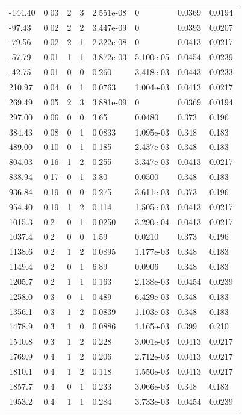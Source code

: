 \documentclass[preview]{standalone}
\begin{document}
{{\begin{tabular}{L{1.2cm}C{1.2cm} C{0.3cm}C{0.5cm} C{1.4cm}C{1.4cm} C{1.4cm}C{1.4cm}}
  -144.40  &  0.03  & 2     &  3 &  2.551e-08  & 0  & 0.0369 &  0.0194   \\ 
  -97.43  &  0.02  & 2     &  2 &  3.447e-09  & 0  & 0.0393 &  0.0207   \\ 
  -79.56  &  0.02  & 2     &  1 &  2.322e-08  & 0  & 0.0413 &  0.0217   \\ 
  -57.79  &  0.01  & 1     &  1 &  3.872e-03  & 5.100e-05  & 0.0454 &  0.0239   \\ 
  -42.75  &  0.01  & 0     &  0 &  0.260  & 3.418e-03  & 0.0443 &  0.0233   \\ 
  210.97  &  0.04  & 0     &  1 &  0.0763  & 1.004e-03  & 0.0413 &  0.0217   \\ 
  269.49  &  0.05  & 2     &  3 &  3.881e-09  & 0  & 0.0369 &  0.0194   \\ 
  297.00  &  0.06  & 0     &  0 &  3.65  & 0.0480  & 0.373 &  0.196   \\ 
  384.43  &  0.08  & 0     &  1 &  0.0833  & 1.095e-03  & 0.348 &  0.183   \\ 
  489.00  &  0.10  & 0     &  1 &  0.185  & 2.437e-03  & 0.348 &  0.183   \\ 
  804.03  &  0.16  & 1     &  2 &  0.255  & 3.347e-03  & 0.0413 &  0.0217   \\ 
  838.94  &  0.17  & 0     &  1 &  3.80  & 0.0500  & 0.348 &  0.183   \\ 
  936.84  &  0.19  & 0     &  0 &  0.275  & 3.611e-03  & 0.373 &  0.196   \\ 
  954.40  &  0.19  & 1     &  2 &  0.114  & 1.505e-03  & 0.0413 &  0.0217   \\ 
  1015.3  &   0.2  & 0     &  1 &  0.0250  & 3.290e-04  & 0.0413 &  0.0217   \\ 
  1037.4  &   0.2  & 0     &  0 &  1.59  & 0.0210  & 0.373 &  0.196   \\ 
  1138.6  &   0.2  & 1     &  2 &  0.0895  & 1.177e-03  & 0.348 &  0.183   \\ 
  1149.4  &   0.2  & 0     &  1 &  6.89  & 0.0906  & 0.348 &  0.183   \\ 
  1205.7  &   0.2  & 1     &  1 &  0.163  & 2.138e-03  & 0.0454 &  0.0239   \\ 
  1258.0  &   0.3  & 0     &  1 &  0.489  & 6.429e-03  & 0.348 &  0.183   \\ 
  1356.1  &   0.3  & 1     &  2 &  0.0839  & 1.103e-03  & 0.348 &  0.183   \\ 
  1478.9  &   0.3  & 1     &  0 &  0.0886  & 1.165e-03  & 0.399 &  0.210   \\ 
  1540.8  &   0.3  & 1     &  2 &  0.228  & 3.001e-03  & 0.0413 &  0.0217   \\ 
  1769.9  &   0.4  & 1     &  2 &  0.206  & 2.712e-03  & 0.0413 &  0.0217   \\ 
  1810.1  &   0.4  & 1     &  2 &  0.118  & 1.550e-03  & 0.0413 &  0.0217   \\ 
  1857.7  &   0.4  & 0     &  1 &  0.233  & 3.066e-03  & 0.348 &  0.183   \\ 
  1953.2  &   0.4  & 1     &  1 &  0.284  & 3.733e-03  & 0.0454 &  0.0239   \\ 
\hline 
\end{tabular} 

}}
\end{document}
